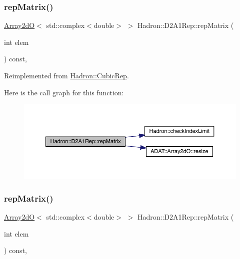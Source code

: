 \subsubsection{\texorpdfstring{repMatrix()}{repMatrix()}\hspace{0.1cm}{\footnotesize\ttfamily [1/2]}}
{\footnotesize\ttfamily \mbox{\hyperlink{classADAT_1_1Array2dO}{Array2dO}}$<$ std\+::complex$<$double$>$ $>$ Hadron\+::\+D2\+A1\+Rep\+::rep\+Matrix (\begin{DoxyParamCaption}\item[{int}]{elem }\end{DoxyParamCaption}) const\hspace{0.3cm}{\ttfamily [inline]}, {\ttfamily [virtual]}}



Reimplemented from \mbox{\hyperlink{structHadron_1_1CubicRep_ac5d7e9e6f4ab1158b5fce3e4ad9e8005}{Hadron\+::\+Cubic\+Rep}}.

Here is the call graph for this function\+:
\nopagebreak
\begin{figure}[H]
\begin{center}
\leavevmode
\includegraphics[width=350pt]{d5/d28/structHadron_1_1D2A1Rep_a0d9bec731ada6fec10956dce667b2ffd_cgraph}
\end{center}
\end{figure}
\mbox{\label{structHadron_1_1D2A1Rep_a0d9bec731ada6fec10956dce667b2ffd}} 
\subsubsection{\texorpdfstring{repMatrix()}{repMatrix()}\hspace{0.1cm}{\footnotesize\ttfamily [2/2]}}
{\footnotesize\ttfamily \mbox{\hyperlink{classADAT_1_1Array2dO}{Array2dO}}$<$ std\+::complex$<$double$>$ $>$ Hadron\+::\+D2\+A1\+Rep\+::rep\+Matrix (\begin{DoxyParamCaption}\item[{int}]{elem }\end{DoxyParamCaption}) const\hspace{0.3cm}{\ttfamily [inline]}, {\ttfamily [virtual]}}



